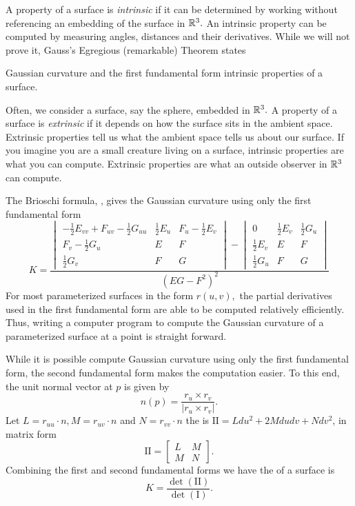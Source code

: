 A property of a surface is \emph{intrinsic} if it can be determined by working without referencing
an embedding of the surface in $\mathbb{R}^3.$ An intrinsic property can be computed by measuring angles,
distances and their derivatives. While we will not prove it, Gauss's Egregious (remarkable) Theorem states
\begin{theorem}
 Gaussian curvature and the first fundamental form intrinsic properties of a surface.
\end{theorem}

Often, we consider a surface, say the sphere, embedded in $\mathbb{R}^3.$ A property of a surface is
\emph{extrinsic} if it depends on how the surface sits in the ambient space. Extrinsic properties
tell us what the ambient space tells us about our surface. If you imagine you are a small
creature living on a surface, intrinsic properties are what you can compute. Extrinsic properties
are what an outside observer in $\mathbb{R}^3$ can compute.

The Brioschi formula, \cite{teo2024brioschi}, gives the Gaussian curvature using only the first fundamental form
\begin{equation}\label{eq:brioschi}
	K=\frac{\begin{vmatrix}
-\frac{1}{2}E_{vv}+F_{uv}-\frac{1}{2}G_{uu} & \frac{1}{2}E_u & F_u-\frac{1}{2}E_v\\
F_v-\frac{1}{2}G_u & E & F\\
\frac{1}{2}G_v & F & G
\end{vmatrix}-\begin{vmatrix}
0 & \frac{1}{2}E_v & \frac{1}{2}G_u\\
\frac{1}{2}E_v & E & F\\
\frac{1}{2}G_u & F & G
\end{vmatrix}}{(EG-F^2)^2}
\end{equation}
For most parameterized surfaces in the form $r(u,v),$ the partial derivatives used in the
first fundamental form are able to be computed relatively efficiently. Thus,
writing a computer program to compute the Gaussian curvature of a parameterized
surface at a point is straight forward.


While it is possible compute Gaussian curvature using only the first fundamental form,
 the second fundamental form makes the computation easier.
To this end, the unit normal vector at $p$ is given by $$n(p)=\frac{r_u\times r_v}{|r_u\times r_v|}.$$
Let $L=r_{uu}\cdot n, M=r_{uv}\cdot n$ and $N=r_{vv}\cdot n$ the
 is $\mathrm{I\!I}=Ldu^2+2Mdudv+Ndv^2$,
in matrix form $$\mathrm{I\!I}=\begin{bmatrix}
L & M \\
M & N 
\end{bmatrix}.$$
Combining the first and second fundamental forms we have
the  of a surface is
\begin{equation}\label{eqn:curve-dets}
 	K=\frac{\det(\mathrm{I\!I})}{\det(\mathrm{I})}.
\end{equation}



